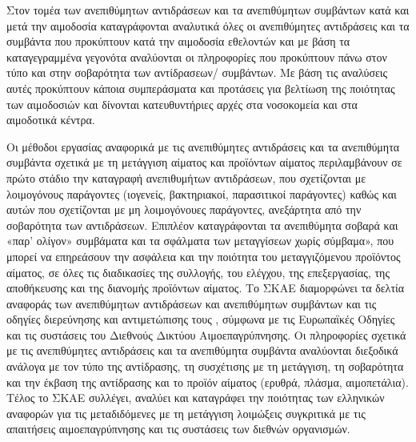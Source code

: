 	Στον τομέα των ανεπιθύμητων αντιδράσεων και τα ανεπιθύμητων συμβάντων κατά και μετά την αιμοδοσία καταγράφονται αναλυτικά όλες οι ανεπιθύμητες αντιδράσεις και τα συμβάντα που προκύπτουν κατά την αιμοδοσία εθελοντών και με βάση τα καταγεγραμμένα γεγονότα αναλύονται οι πληροφορίες που προκύπτουν πάνω στον τύπο και στην σοβαρότητα των αντίδρασεων/ συμβάντων. Με βάση τις αναλύσεις αυτές προκύπτουν κάποια συμπεράσματα και προτάσεις για βελτίωση της ποιότητας των αιμοδοσιών και δίνονται κατευθυντήριες αρχές στα νοσοκομεία και στα αιμοδοτικά κέντρα.
	
	Οι μέθοδοι εργασίας αναφορικά με τις ανεπιθύμητες αντιδράσεις και τα ανεπιθύμητα συμβάντα σχετικά με τη μετάγγιση αίματος και προϊόντων αίματος περιλαμβάνουν σε πρώτο στάδιο την καταγραφή ανεπιθυμήτων αντιδράσεων, που σχετίζονται με λοιμογόνους παράγοντες (ιογενείς, βακτηριακοί, παρασιτικοί παράγοντες) καθώς και αυτών που σχετίζονται με μη λοιμογόνουες παράγοντες, ανεξάρτητα από την σοβαρότητα των αντιδράσεων. Επιπλέον καταγράφονται τα ανεπιθύμητα σοβαρά και «παρ’ ολίγον» συμβάματα και τα σφάλματα των μεταγγίσεων χωρίς σύμβαμα», που μπορεί να επηρεάσουν την ασφάλεια και την ποιότητα του μεταγγιζόμενου προϊόντος αίματος, σε όλες τις διαδικασίες της συλλογής, του ελέγχου, της επεξεργασίας, της αποθήκευσης και της διανομής προϊόντων αίματος. Το ΣΚΑΕ διαμορφώνει τα δελτία αναφοράς των ανεπιθύμητων αντιδράσεων και ανεπιθύμητων συμβάντων και τις οδηγίες διερεύνησης και αντιμετώπισης τους , σύμφωνα με τις Ευρωπαϊκές Οδηγίες και τις συστάσεις του Διεθνούς Δικτύου Αιμοεπαγρύπνησης. Οι πληροφορίες σχετικά με τις ανεπιθύμητες αντιδράσεις και τα ανεπιθύμητα συμβάντα αναλύονται διεξοδικά ανάλογα με τον τύπο της αντίδρασης, τη συσχέτισης με τη μετάγγιση, τη σοβαρότητα και την έκβαση της αντίδρασης και το προϊόν αίματος (ερυθρά, πλάσμα, αιμοπετάλια). Τέλος το ΣΚΑΕ συλλέγει, αναλύει και καταγράφει την ποιότητας των ελληνικών αναφορών για τις μεταδιδόμενες με τη μετάγγιση λοιμώξεις συγκριτικά με τις απαιτήσεις αιμοεπαγρύπνησης και τις συστάσεις των διεθνών οργανισμών.
	
